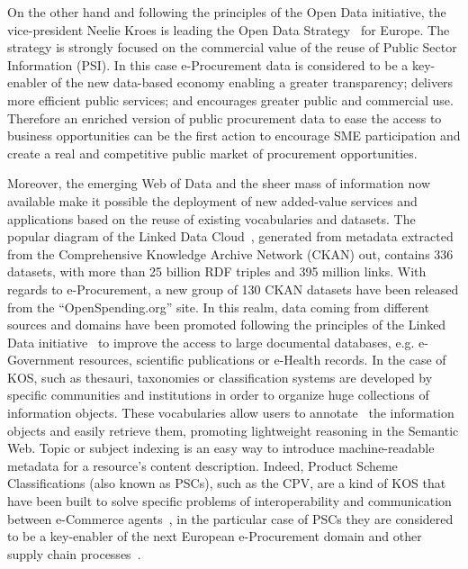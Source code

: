 On the other hand and following the principles of the Open Data initiative, the vice-president Neelie Kroes is 
leading the Open Data Strategy~\cite{d2003} for Europe. The strategy is strongly focused on the commercial 
value of the reuse of Public Sector Information (PSI). In this case e-Procurement data is considered to be 
a key-enabler of the new data-based economy enabling a greater transparency; delivers more efficient public services; and encourages 
greater public and commercial use. Therefore an enriched version of public procurement data to ease the access 
to business opportunities can be the first action to encourage SME participation and create a real and competitive 
public market of procurement opportunities. 


Moreover, the emerging Web of Data and the sheer mass of information now available make it possible the deployment of new 
added-value services and applications based on the reuse of existing vocabularies and datasets. 
The popular diagram of the Linked Data Cloud~\cite{linked-data-cloud}, generated from metadata extracted from the 
Comprehensive Knowledge Archive Network (CKAN) out, contains $336$ datasets, with more than 25 billion RDF triples and 395 million links. 
With regards to e-Procurement, a new group of 130 CKAN datasets have been released from the ``OpenSpending.org'' site. In this realm, 
data coming from different sources and domains have been promoted following the principles of the 
Linked Data initiative~\cite{Berners-Lee-2006} to improve the access to large documental databases, 
e.g. e-Government resources, scientific publications or e-Health records. In the case of KOS, such as thesauri, taxonomies or classification systems 
are developed by specific communities and institutions in order to organize huge collections of information objects. 
These vocabularies allow users to annotate~\cite{Leukel-standard,Leukel-automating,Leukel-comparative} the information objects and easily retrieve them, 
promoting lightweight reasoning in the Semantic Web. Topic or subject indexing is an easy way to introduce machine-readable metadata for a resource's content 
description. Indeed, Product Scheme Classifications (also known as PSCs), such as the CPV, are a kind of KOS that have been built to solve specific problems 
of interoperability and communication between e-Commerce agents~\cite{FenselOmel2001,Leukel-findings}, in the particular case of PSCs they are considered to be a key-enabler of 
the next European e-Procurement domain and other supply chain processes~\cite{DBLP:journals/tcci/Alor-HernandezAJPRMBG10}.

